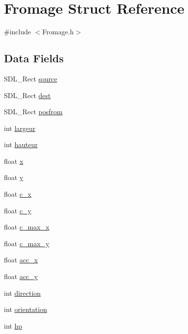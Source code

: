 \hypertarget{struct_fromage}{\section{Fromage Struct Reference}
\label{struct_fromage}
}


{\ttfamily \#include $<$Fromage.\-h$>$}

\subsection*{Data Fields}
\begin{DoxyCompactItemize}
\item 
S\-D\-L\-\_\-\-Rect \hyperlink{struct_fromage_a4b36eb370ba51290847183a8da37db31}{source}
\item 
S\-D\-L\-\_\-\-Rect \hyperlink{struct_fromage_a1d4c1bb15892e31b9af1f4fcf5d31fab}{dest}
\item 
S\-D\-L\-\_\-\-Rect \hyperlink{struct_fromage_a0fcd2fb6981b924459a467441bf99419}{posfrom}
\item 
int \hyperlink{struct_fromage_a74f0f2591e5f65bf792b2c3c67817d78}{largeur}
\item 
int \hyperlink{struct_fromage_a5e94a2f98c16e8b6860f95c99da1c0d3}{hauteur}
\item 
float \hyperlink{struct_fromage_ad0da36b2558901e21e7a30f6c227a45e}{x}
\item 
float \hyperlink{struct_fromage_aa4f0d3eebc3c443f9be81bf48561a217}{y}
\item 
float \hyperlink{struct_fromage_a4a1cf9110d6aeb65343be53dbfb5f5e9}{c\-\_\-x}
\item 
float \hyperlink{struct_fromage_a948ae6c4d8e4618590ebc2c1b13d0451}{c\-\_\-y}
\item 
float \hyperlink{struct_fromage_acc9793492dfac2fbf5259cf46e4d6067}{c\-\_\-max\-\_\-x}
\item 
float \hyperlink{struct_fromage_a6fc56c58b8aa8a676f9d3c473b35dbe0}{c\-\_\-max\-\_\-y}
\item 
float \hyperlink{struct_fromage_ab3ac8e1dc34f396339f93c01d2782044}{acc\-\_\-x}
\item 
float \hyperlink{struct_fromage_a781272f25ca67525c9902c98577122e3}{acc\-\_\-y}
\item 
int \hyperlink{struct_fromage_a886d551d5381dc3e53f17825ffc51641}{direction}
\item 
int \hyperlink{struct_fromage_a528d22a2a1651a4831eb643884a3c718}{orientation}
\item 
int \hyperlink{struct_fromage_a9aa790f93d2d067a4f5608fdb8409f94}{hp}

\end{DoxyCompactItemize}
